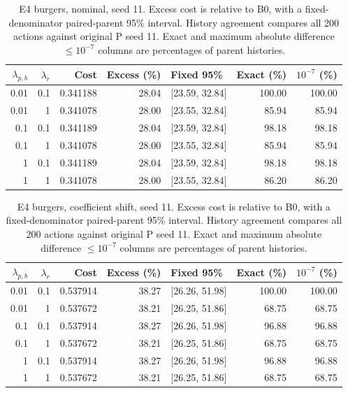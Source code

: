 \begin{table}[ht]
\centering\small
\caption{E4 burgers, nominal, seed 11. Excess cost is relative to B0, with a fixed-denominator paired-parent 95\% interval. History agreement compares all 200 actions against original P seed 11. Exact and maximum absolute difference $\leq10^{-7}$ columns are percentages of parent histories.}\label{tab:weights_control_burgers_locked_nominal}
\begin{tabular}{@{}rrrrlrr@{}}\toprule
$\lambda_{p,b}$ & $\lambda_r$ & Cost & Excess (\%) & Fixed 95\% & Exact (\%) & $10^{-7}$ (\%)\\\midrule
0.01 & 0.1 & 0.341188 & 28.04 & [23.59, 32.84] & 100.00 & 100.00\\
0.01 & 1 & 0.341078 & 28.00 & [23.55, 32.84] & 85.94 & 85.94\\
0.1 & 0.1 & 0.341189 & 28.04 & [23.59, 32.84] & 98.18 & 98.18\\
0.1 & 1 & 0.341078 & 28.00 & [23.55, 32.84] & 85.94 & 85.94\\
1 & 0.1 & 0.341189 & 28.04 & [23.59, 32.84] & 98.18 & 98.18\\
1 & 1 & 0.341078 & 28.00 & [23.55, 32.84] & 86.20 & 86.20\\
\bottomrule\end{tabular}
\end{table}

\begin{table}[ht]
\centering\small
\caption{E4 burgers, coefficient shift, seed 11. Excess cost is relative to B0, with a fixed-denominator paired-parent 95\% interval. History agreement compares all 200 actions against original P seed 11. Exact and maximum absolute difference $\leq10^{-7}$ columns are percentages of parent histories.}\label{tab:weights_control_burgers_locked_coefficient_ood}
\begin{tabular}{@{}rrrrlrr@{}}\toprule
$\lambda_{p,b}$ & $\lambda_r$ & Cost & Excess (\%) & Fixed 95\% & Exact (\%) & $10^{-7}$ (\%)\\\midrule
0.01 & 0.1 & 0.537914 & 38.27 & [26.26, 51.98] & 100.00 & 100.00\\
0.01 & 1 & 0.537672 & 38.21 & [26.25, 51.86] & 68.75 & 68.75\\
0.1 & 0.1 & 0.537914 & 38.27 & [26.26, 51.98] & 96.88 & 96.88\\
0.1 & 1 & 0.537672 & 38.21 & [26.25, 51.86] & 68.75 & 68.75\\
1 & 0.1 & 0.537914 & 38.27 & [26.26, 51.98] & 96.88 & 96.88\\
1 & 1 & 0.537672 & 38.21 & [26.25, 51.86] & 68.75 & 68.75\\
\bottomrule\end{tabular}
\end{table}

